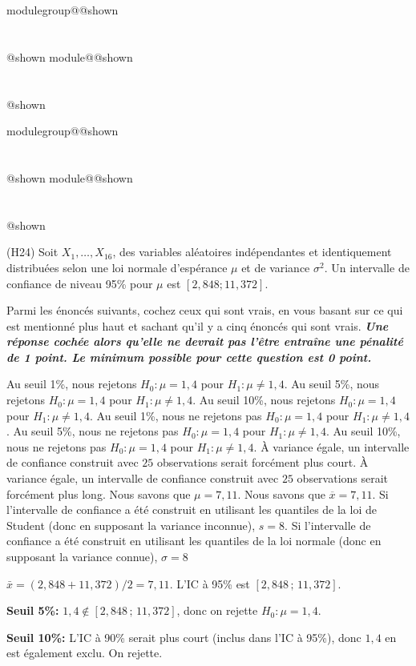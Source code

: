 \documentclass{Evaluation}
\makeatletter
\newcommand{\currentmodulekey}{}
\newcommand{\currentmoduletitle}{}
\newcommand{\currentgroupkey}{}
\newcommand{\currentgrouptitle}{}
\newcommand{\showmoduleifneeded}{%
  \ifx\currentgroupkey\empty\else
    \expandafter\ifx\csname modulegroup@\currentgroupkey @shown\endcsname\relax
      \section*{\currentgrouptitle}%
      \expandafter\gdef\csname modulegroup@\currentgroupkey @shown\endcsname{1}%
    \fi
  \fi
  \expandafter\ifx\csname module@\currentmodulekey @shown\endcsname\relax
    \section*{\currentmoduletitle}%
    \expandafter\gdef\csname module@\currentmodulekey @shown\endcsname{1}%
  \fi
}
\newenvironment{H24}{\showmoduleifneeded}{}
\makeatother
\begin{document}
\begin{questions}
\begin{H24}
\begin{parts}
\end{parts}
\end{H24}

\begin{H24}
\question (H24)
Soit $X_1,\hdots,X_{16}$, des variables aléatoires indépendantes et identiquement distribuées selon une loi normale d'espérance $\mu$ et de variance $\sigma^2$. Un intervalle de confiance de niveau 95\% pour $\mu$ est $[2,848 ; 11,372]$.

Parmi les énoncés suivants, cochez ceux qui sont vrais, en vous basant sur ce qui est mentionné plus haut et sachant qu'il y a cinq énoncés qui sont vrais. \textit{\textbf{Une réponse cochée alors qu'elle ne devrait pas l'être entraîne une pénalité de 1 point. Le minimum possible pour cette question est 0 point.}}
    

    \begin{checkboxes}
        \choice Au seuil 1\%, nous rejetons $H_0: \mu=1,4$ pour $H_1:\mu \neq 1,4$.
        \CorrectChoice Au seuil 5\%, nous rejetons $H_0: \mu=1,4$ pour $H_1:\mu \neq 1,4$.
        \correctchoice Au seuil 10\%, nous rejetons $H_0: \mu=1,4$ pour $H_1:\mu \neq 1,4$.
        \choice Au seuil 1\%, nous ne rejetons pas $H_0: \mu=1,4$ pour $H_1:\mu \neq 1,4$.
        \choice Au seuil 5\%, nous ne rejetons pas $H_0: \mu=1,4$ pour $H_1:\mu \neq 1,4$.
        \choice Au seuil 10\%, nous ne rejetons pas $H_0: \mu=1,4$ pour $H_1:\mu \neq 1,4$.
        \correctchoice À variance égale, un intervalle de confiance construit avec $25$ observations serait forcément plus court.
        \choice À variance égale, un intervalle de confiance construit avec $25$ observations serait forcément plus long.
        \choice Nous savons que $\mu=7,11$.
        \correctchoice Nous savons que $\overline{x}=7,11$.
        \correctchoice Si l'intervalle de confiance a été construit en utilisant les quantiles de la loi de Student (donc en supposant la variance inconnue), $s=8$.
        \choice Si l'intervalle de confiance a été construit en utilisant les quantiles de la loi normale (donc en supposant la variance connue), $\sigma =8$
    \end{checkboxes}

\begin{solution}
$\bar{x} = (2{,}848 + 11{,}372)/2 = 7{,}11$. L'IC à 95\% est $[2{,}848\,;\,11{,}372]$.

\textbf{Seuil 5\%:} $1{,}4 \notin [2{,}848\,;\,11{,}372]$, donc on rejette $H_0: \mu = 1{,}4$.

\textbf{Seuil 10\%:} L'IC à 90\% serait plus court (inclus dans l'IC à 95\%), donc $1{,}4$ en est également exclu. On rejette.


\end{solution}
\end{H24}
\end{questions}
\end{document}
